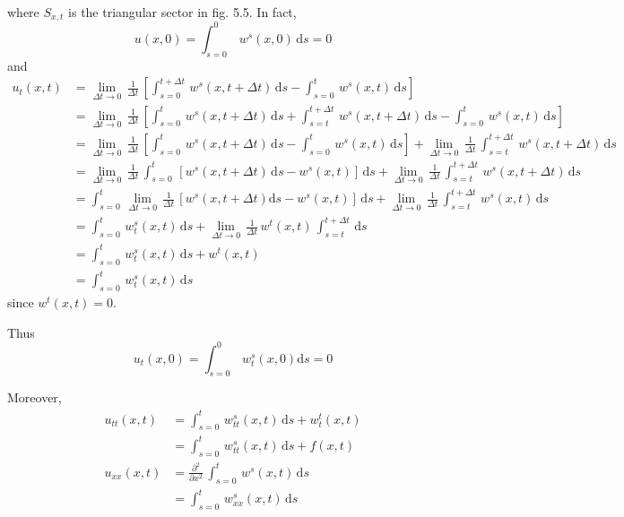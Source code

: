 \documentclass[../main.tex]{subfiles}
\begin{document}
where $S_{x,t}$ is the triangular sector in fig. 5.5. In fact, 
\begin{equation}
    u(x,0) = \int_{s = 0}^0 \, w^s(x,0) \, \mathrm{d} s = 0
\end{equation}
and
\begin{align}
    u_t(x,t) &= \lim_{\Delta t \rightarrow 0} \, \frac{1}{\Delta t} \,  \left[\int_{s = 0}^{t + \Delta t} \, w^s(x,t + \Delta t) \, \mathrm{d} s - \int_{s = 0}^{t} \, w^s(x,t) \, \mathrm{d} s \right] \\
    &= \lim_{\Delta t \rightarrow 0} \, \frac{1}{\Delta t} \, \left[\int_{s = 0}^{t} \, w^s(x,t + \Delta t) \, \mathrm{d} s + \int_{s = t}^{t + \Delta t} \, w^s(x,t + \Delta t) \, \mathrm{d} s - \int_{s = 0}^{t} \, w^s(x,t) \, \mathrm{d} s \right] \\
    &= \lim_{\Delta t \rightarrow 0} \, \frac{1}{\Delta t} \, \left[\int_{s = 0}^{t} \, w^s(x,t + \Delta t) \, \mathrm{d} s - \int_{s = 0}^{t} \, w^s(x,t) \, \mathrm{d} s \right] + \lim_{\Delta t \rightarrow 0} \, \frac{1}{\Delta t} \, \int_{s = t}^{t + \Delta t} \, w^s(x,t + \Delta t) \, \mathrm{d} s \\
    &= \lim_{\Delta t \rightarrow 0} \, \frac{1}{\Delta t} \, \int_{s = 0}^{t} \, \left[ w^s(x,t + \Delta t) \, \mathrm{d} s - w^s(x,t)  \right] \, \mathrm{d} s + \lim_{\Delta t \rightarrow 0} \, \frac{1}{\Delta t} \, \int_{s = t}^{t + \Delta t} \, w^s(x,t + \Delta t) \, \mathrm{d} s \\
    &= \int_{s = 0}^{t} \, \lim_{\Delta t \rightarrow 0} \, \frac{1}{\Delta t} \, \left[ w^s(x,t + \Delta t) \mathrm{d} s - w^s(x,t)  \right] \, \mathrm{d} s + \lim_{\Delta t \rightarrow 0} \, \frac{1}{\Delta t} \, \int_{s = t}^{t + \Delta t} \, w^s(x,t) \, \mathrm{d} s \\
    &= \int_{s = 0}^{t} \,  w_t^s(x,t) \, \mathrm{d} s + \lim_{\Delta t \rightarrow 0} \, \frac{1}{\Delta t} \, w^t(x,t) \, \int_{s = t}^{t + \Delta t} \, \mathrm{d} s \\
    &= \int_{s = 0}^{t} \,  w_t^s(x,t) \, \mathrm{d} s + w^t(x,t) \\
    &= \int_{s = 0}^{t} \,  w_t^s(x,t) \, \mathrm{d} s
\end{align}
since $w^t(x,t) = 0$.

Thus
\begin{equation}
    u_t(x,0) = \int_{s = 0}^{0} \,  w_t^s(x,0) \mathrm{d} s = 0
\end{equation}

Moreover,
\begin{align}
    u_{tt}(x,t) &= \int_{s = 0}^{t} \,  w_{tt}^s(x,t) \, \mathrm{d} s + w_t^t(x,t) \\
    &= \int_{s = 0}^{t} \,  w_{tt}^s(x,t) \, \mathrm{d} s + f(x,t) \\
    u_{xx}(x,t) &= \frac{\partial^2}{\partial x^2} \, \int_{s = 0}^t \, w^s(x,t) \, \mathrm{d} s \\
    &= \int_{s = 0}^{t} \,  w_{xx}^s(x,t) \, \mathrm{d} s
\end{align}
\end{document}
